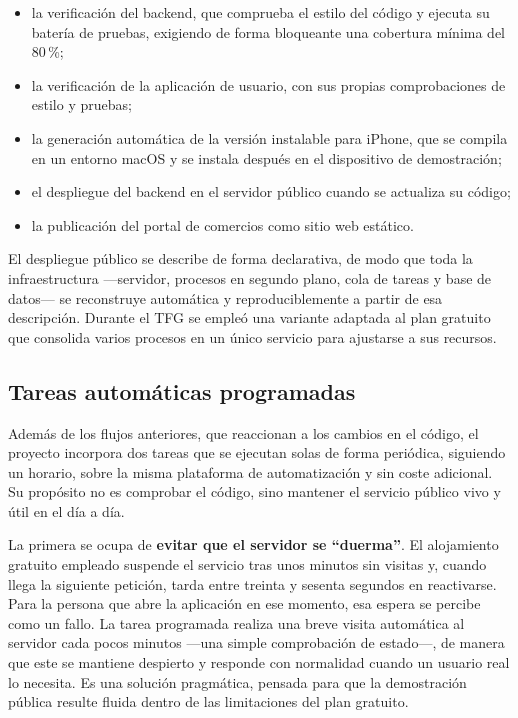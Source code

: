 \begin{itemize}
  \item la verificaci\'on del backend, que comprueba el estilo del c\'odigo y ejecuta su bater\'ia
    de pruebas, exigiendo de forma bloqueante una cobertura m\'inima del 80\,\%;
  \item la verificaci\'on de la aplicaci\'on de usuario, con sus propias comprobaciones de estilo
    y pruebas;
  \item la generaci\'on autom\'atica de la versi\'on instalable para iPhone, que se compila en un
    entorno macOS y se instala despu\'es en el dispositivo de demostraci\'on;
  \item el despliegue del backend en el servidor p\'ublico cuando se actualiza su c\'odigo;
  \item la publicaci\'on del portal de comercios como sitio web est\'atico.
\end{itemize}

El despliegue p\'ublico se describe de forma declarativa, de modo que toda la infraestructura
---servidor, procesos en segundo plano, cola de tareas y base de datos--- se reconstruye autom\'atica
y reproduciblemente a partir de esa descripci\'on. Durante el TFG se emple\'o una variante adaptada
al plan gratuito que consolida varios procesos en un \'unico servicio para ajustarse a sus recursos.

\subsection{Tareas autom\'aticas programadas}\label{subsec:tareas-programadas}

Adem\'as de los flujos anteriores, que reaccionan a los cambios en el c\'odigo, el proyecto
incorpora dos tareas que se ejecutan solas de forma peri\'odica, siguiendo un horario, sobre la
misma plataforma de automatizaci\'on y sin coste adicional. Su prop\'osito no es comprobar el
c\'odigo, sino mantener el servicio p\'ublico vivo y \'util en el d\'ia a d\'ia.

La primera se ocupa de \textbf{evitar que el servidor se ``duerma''}. El alojamiento gratuito
empleado suspende el servicio tras unos minutos sin visitas y, cuando llega la siguiente petici\'on,
tarda entre treinta y sesenta segundos en reactivarse. Para la persona que abre la aplicaci\'on en
ese momento, esa espera se percibe como un fallo. La tarea programada realiza una breve visita
autom\'atica al servidor cada pocos minutos ---una simple comprobaci\'on de estado---, de manera que
este se mantiene despierto y responde con normalidad cuando un usuario real lo necesita. Es una
soluci\'on pragm\'atica, pensada para que la demostraci\'on p\'ublica resulte fluida dentro de las
limitaciones del plan gratuito.

